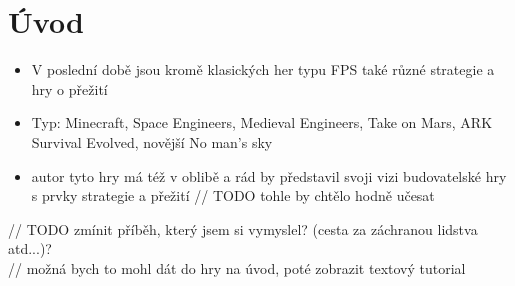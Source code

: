 
\chapter*{Úvod}

\begin{itemize}
	\item V poslední době jsou kromě klasických her typu FPS také různé strategie a hry o přežití
	\item Typ: Minecraft, Space Engineers, Medieval Engineers, Take on Mars, ARK Survival Evolved, novější No man's sky
	\item autor tyto hry má též v oblibě a rád by představil svoji vizi budovatelské hry s prvky strategie a přežití		// TODO tohle by chtělo hodně učesat
\end{itemize}		

// TODO zmínit příběh, který jsem si vymyslel? (cesta za záchranou lidstva atd...)? \\

// možná bych to mohl dát do hry na úvod, poté zobrazit textový tutorial